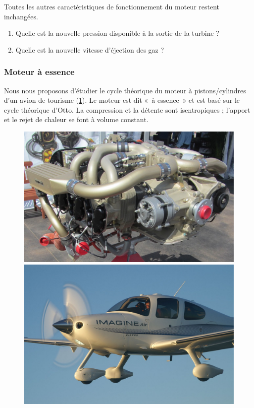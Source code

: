 		Toutes les autres caractéristiques de fonctionnement du moteur restent inchangées.
		
		\begin{enumerate}
			\item Quelle est la nouvelle pression disponible à la sortie de la turbine ?
			\item Quelle est la nouvelle vitesse d’éjection des gaz ?
		\end{enumerate}


\subsubsection{Moteur à essence}


	Nous nous proposons d’étudier le cycle théorique du moteur à pistons/cylindres d’un avion de tourisme (\cref{fig_photos_moteur_essence}). Le moteur est dit «~à essence~» et est basé sur le cycle théorique d’Otto.
La compression et la détente sont isentropiques ; l’apport et le rejet de chaleur se font à volume constant.
	
	\begin{figure}
		\begin{center}
			\includegraphics[height=0.315\textwidth]{images/photo_continental_io-550.jpg}
			\includegraphics[height=0.315\textwidth]{images/photo_sr22.jpg}
		\end{center}
		\label{fig_photos_moteur_essence}
	\end{figure}
	
